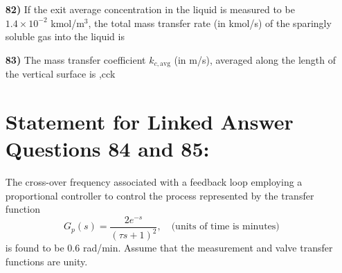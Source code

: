 \documentclass[journal,12pt,onecolumn]{IEEEtran}
\theoremstyle{remark}
\begin{document}
\begin{enumerate}
\begin{enumerate}
    \item[\textbf{82)}] If the exit average concentration in the liquid is measured to be $1.4 \times 10^{-2}$ kmol/m$^3$, the total mass transfer rate (in kmol/s) of the sparingly soluble gas into the liquid is
    \hfill{}
    \begin{enumerate}
    \end{enumerate}
 \item[\textbf{83)}] The mass transfer coefficient $k_{c,\text{avg}}$ (in m/s), averaged along the length of the vertical surface is
 \hfill{\bracc,cck{}}
    \begin{enumerate}
    \end{enumerate}
\section*{Statement for Linked Answer Questions 84 and 85:}
The cross-over frequency associated with a feedback loop employing a proportional controller to control the process represented by the transfer function
\[G_p(s) = \frac{2 e^{-s}}{(\tau s + 1)^2}, \quad \text{(units of time is minutes)}\]
is found to be $0.6$ rad/min. Assume that the measurement and valve transfer functions are unity.


\end{enumerate}
\end{enumerate}
\end{document}
